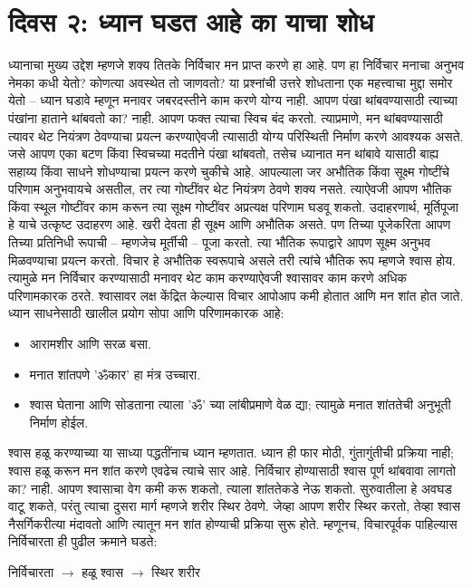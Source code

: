\section*{दिवस २: ध्यान घडत आहे का याचा शोध}
ध्यानाचा मुख्य उद्देश म्हणजे शक्य तितके निर्विचार मन प्राप्त करणे हा आहे. पण हा निर्विचार मनाचा अनुभव नेमका कधी येतो? कोणत्या अवस्थेत तो जाणवतो? या प्रश्नांची उत्तरे शोधताना एक महत्त्वाचा मुद्दा समोर येतो – ध्यान घडावे म्हणून मनावर जबरदस्तीने काम करणे योग्य नाही. आपण पंखा थांबवण्यासाठी त्याच्या पंखांना हाताने थांबवतो का? नाही. आपण फक्त त्याचा स्विच बंद करतो. त्याप्रमाणे, मन थांबवण्यासाठी त्यावर थेट नियंत्रण ठेवण्याचा प्रयत्न करण्याऐवजी त्यासाठी योग्य परिस्थिती निर्माण करणे आवश्यक असते. जसे आपण एका बटण किंवा स्विचच्या मदतीने पंखा थांबवतो, तसेच ध्यानात मन थांबावे यासाठी बाह्य सहाय्य किंवा साधने शोधण्याचा प्रयत्न करणे चुकीचे आहे.
आपल्याला जर अभौतिक किंवा सूक्ष्म गोष्टींचे परिणाम अनुभवायचे असतील, तर त्या गोष्टींवर थेट नियंत्रण ठेवणे शक्य नसते. त्याऐवजी आपण भौतिक किंवा स्थूल गोष्टींवर काम करून त्या सूक्ष्म गोष्टींवर अप्रत्यक्ष परिणाम घडवू शकतो. उदाहरणार्थ, मूर्तिपूजा हे याचे उत्कृष्ट उदाहरण आहे. खरी देवता ही सूक्ष्म आणि अभौतिक असते. पण तिच्या पूजेकरिता आपण तिच्या प्रतिनिधी रूपाची – म्हणजेच मूर्तीची – पूजा करतो. त्या भौतिक रूपाद्वारे आपण सूक्ष्म अनुभव मिळवण्याचा प्रयत्न करतो.
विचार हे अभौतिक स्वरूपाचे असले तरी त्यांचे भौतिक रूप म्हणजे श्वास होय. त्यामुळे मन निर्विचार करण्यासाठी मनावर थेट काम करण्याऐवजी श्वासावर काम करणे अधिक परिणामकारक ठरते. श्वासावर लक्ष केंद्रित केल्यास विचार आपोआप कमी होतात आणि मन शांत होत जाते.
ध्यान साधनेसाठी खालील प्रयोग सोपा आणि परिणामकारक आहे:
\begin{itemize}
 \item आरामशीर आणि सरळ बसा.
 \item मनात शांतपणे 'ॐकार' हा मंत्र उच्चारा.
 \item श्वास घेताना आणि सोडताना त्याला 'ॐ' च्या लांबीप्रमाणे वेळ द्या; त्यामुळे मनात शांततेची अनुभूती निर्माण होईल.
 \end{itemize}
श्वास हळू करण्याच्या या साध्या पद्धतींनाच ध्यान म्हणतात. ध्यान ही फार मोठी, गुंतागुंतीची प्रक्रिया नाही; श्वास हळू करून मन शांत करणे एवढेच त्याचे सार आहे.
निर्विचार होण्यासाठी श्वास पूर्ण थांबवावा लागतो का? नाही. आपण श्वासाचा वेग कमी करू शकतो, त्याला शांततेकडे नेऊ शकतो. सुरुवातीला हे अवघड वाटू शकते, परंतु त्याचा दुसरा मार्ग म्हणजे शरीर स्थिर ठेवणे. जेव्हा आपण शरीर स्थिर करतो, तेव्हा श्वास नैसर्गिकरीत्या मंदावतो आणि त्यातून मन शांत होण्याची प्रक्रिया सुरू होते.
म्हणूनच, विचारपूर्वक पाहिल्यास निर्विचारता ही पुढील क्रमाने घडते:

निर्विचारता $\rightarrow$ हळू श्वास $\rightarrow$ स्थिर शरीर

